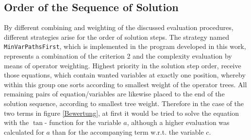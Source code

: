\subsection{Order of the Sequence of Solution}

By different combining and weighting of the discussed evaluation procedures,   different strategies arise for the order of solution steps. The strategy named \verb+MinVarPathsFirst+, which is implemented in the program developed in this work, represents a combination of the criterion 2 and the complexity evaluation by means of operator weighting. 
Highest priority in the solution step order, receive those equations, which contain wanted variables at exactly one position, whereby within this group one sorts according to smallest weight of the operator trees. 
All remaining pairs of equation/variables are likewise placed to the end of the solution sequence, according to smallest tree weight. 
Therefore in the case of the two terms in figure \ref{Bewertung}, at first it would be  tried to solve the equation with the $\tan$- function for the variable $a$, although  a higher evaluation was calculated for $a$ than for the accompanying term w.r.t. the variable $c$.







